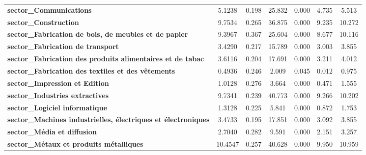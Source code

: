\begin{center}
\begin{tabular}{lcccccc}
\textbf{sector\_Communications}                                       &       5.1238  &        0.198     &    25.832  &         0.000        &        4.735    &        5.513     \\
\textbf{sector\_Construction}                                         &       9.7534  &        0.265     &    36.875  &         0.000        &        9.235    &       10.272     \\
\textbf{sector\_Fabrication de bois, de meubles et de papier}         &       9.3967  &        0.367     &    25.604  &         0.000        &        8.677    &       10.116     \\
\textbf{sector\_Fabrication de transport}                             &       3.4290  &        0.217     &    15.789  &         0.000        &        3.003    &        3.855     \\
\textbf{sector\_Fabrication des produits alimentaires et de tabac}    &       3.6116  &        0.204     &    17.691  &         0.000        &        3.211    &        4.012     \\
\textbf{sector\_Fabrication des textiles et des vêtements}            &       0.4936  &        0.246     &     2.009  &         0.045        &        0.012    &        0.975     \\
\textbf{sector\_Impression et Edition}                                &       1.0128  &        0.276     &     3.664  &         0.000        &        0.471    &        1.555     \\
\textbf{sector\_Industries extractives}                               &       9.7341  &        0.239     &    40.773  &         0.000        &        9.266    &       10.202     \\
\textbf{sector\_Logiciel informatique}                                &       1.3128  &        0.225     &     5.841  &         0.000        &        0.872    &        1.753     \\
\textbf{sector\_Machines industrielles, électriques et électroniques} &       3.4733  &        0.195     &    17.851  &         0.000        &        3.092    &        3.855     \\
\textbf{sector\_Média et diffusion}                                   &       2.7040  &        0.282     &     9.591  &         0.000        &        2.151    &        3.257     \\
\textbf{sector\_Métaux et produits métalliques}                       &      10.4547  &        0.257     &    40.628  &         0.000        &        9.950    &       10.959     \\

\end{tabular}
\end{center}
